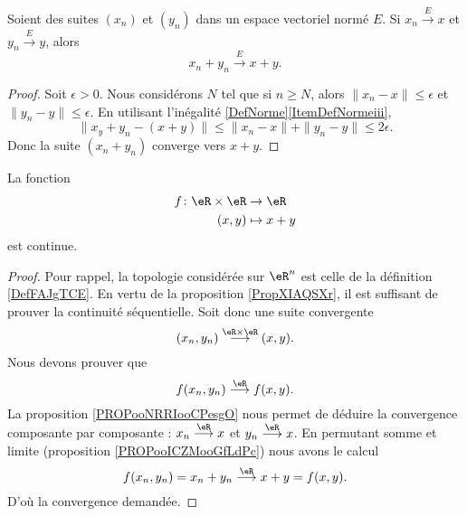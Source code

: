 \begin{proposition}     \label{PROPooICZMooGfLdPc}
	Soient des suites \( (x_n)\) et \( (y_n)\) dans un espace vectoriel normé \( E\). Si \( x_n\stackrel{E}{\longrightarrow}x\) et \( y_n\stackrel{E}{\longrightarrow}y\), alors
	\begin{equation}
		x_n+y_n\stackrel{E}{\longrightarrow}x+y.
	\end{equation}
\end{proposition}

\begin{proof}
	Soit \( \epsilon>0\). Nous considérons \( N\) tel que si \( n\geq N\), alors \( \| x_n-x \|\leq \epsilon\) et \( \| y_n-y \|\leq \epsilon\). En utilisant l'inégalité \ref{DefNorme}\ref{ItemDefNormeiii},
	\begin{equation}
		\| x_y+y_n-(x+y) \|\leq \| x_n-x \|+\| y_n-y \|\leq 2\epsilon.
	\end{equation}
	Donc la suite \( (x_n+y_n)\) converge vers \( x+y\).
\end{proof}

\begin{lemma}       \label{LEMooGKIPooWgpFTB}
	La fonction
	\begin{equation}
		\begin{aligned}
			f\colon \eR\times \eR & \to \eR     \\
			(x,y)                 & \mapsto x+y
		\end{aligned}
	\end{equation}
	est continue.
\end{lemma}

\begin{proof}
	Pour rappel, la topologie considérée sur \( \eR^n\) est celle de la définition \ref{DefFAJgTCE}. En vertu de la proposition \ref{PropXIAQSXr}, il est suffisant de prouver la continuité séquentielle. Soit donc une suite convergente
	\begin{equation}
		(x_n,y_n)\stackrel{\eR\times \eR}{\longrightarrow}(x,y).
	\end{equation}
	Nous devons prouver que
	\begin{equation}
		f(x_n,y_n)\stackrel{\eR}{\longrightarrow}f(x,y).
	\end{equation}
	La proposition \ref{PROPooNRRIooCPesgO} nous permet de déduire la convergence composante par composante : \( x_n\stackrel{\eR}{\longrightarrow}x\) et \( y_n\stackrel{\eR}{\longrightarrow}x\). En permutant somme et limite (proposition \ref{PROPooICZMooGfLdPc}) nous avons le calcul
	\begin{equation}
		f(x_n,y_n)=x_n+y_n\stackrel{\eR}{\longrightarrow}x+y=f(x,y).
	\end{equation}
	D'où la convergence demandée.
\end{proof}

